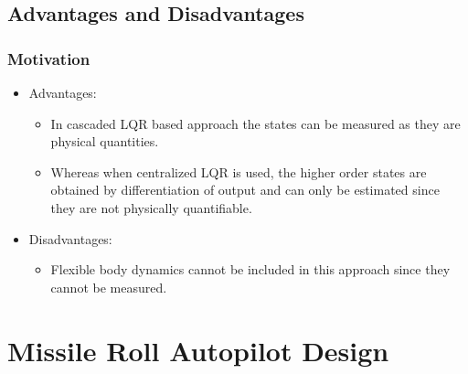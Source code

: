\documentclass[10pt]{beamer}
\begin{document}
\subsection{Advantages and Disadvantages}
\begin{frame}
\frametitle{Motivation}
\begin{itemize}
 \item Advantages: \bigskip
 \begin{itemize}
    \item In cascaded LQR based approach the states can be {\color{blue}measured} as they are physical quantities. \smallskip
    \item Whereas when centralized LQR is used, the higher order states are obtained by differentiation of output and can only be {\color{blue}estimated} since they are not physically quantifiable.  \bigskip
 \end{itemize}
 \item Disadvantages: \smallskip
 \begin{itemize}
 \item {\color{blue}Flexible body dynamics} cannot be included in this approach since they cannot be measured. \bigskip
\end{itemize}
\end{itemize}

\vspace{.4cm}
\end{frame}
\section{ Missile Roll Autopilot Design}
\end{document}
